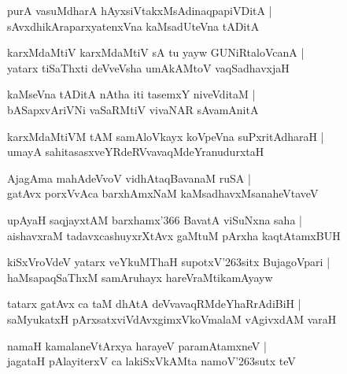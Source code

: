 \begin{shloka}
purA vasuMdharA hAyxsiVtakxMsAdinaqpapiVDitA |\\
sAvxdhikAraparxyatenxVna kaMsadUteVna tADitA
\end{shloka}

\begin{shloka}
karxMdaMtiV karxMdaMtiV sA tu yayw GUNiRtaloVcanA |\\
yatarx tiSaThxti deVveVsha umAkAMtoV vaqSadhavxjaH 
\end{shloka}

\begin{shloka}
kaMseVna tADitA nAtha iti tasemxY niveVditaM |\\
bASapxvAriVNi vaSaRMtiV vivaNAR sAvamAnitA
\end{shloka}

\begin{shloka}
karxMdaMtiVM tAM samAloVkayx koVpeVna suPxritAdharaH |\\
umayA sahitasasxveYRdeRVvavaqMdeYranudurxtaH
\end{shloka}

\begin{shloka}
AjagAma mahAdeVvoV vidhAtaqBavanaM ruSA |\\
gatAvx porxVvAca barxhAmxNaM kaMsadhavxMsanaheVtaveV
\end{shloka}

\begin{shloka}
upAyaH saqjayxtAM barxhamx\char'366 BavatA viSuNxna saha |\\
aishavxraM tadavxcashuyxrXtAvx gaMtuM pArxha kaqtAtamxBUH
\end{shloka}

\begin{shloka}
kiSxVroVdeV yatarx veYkuMThaH supotxV\char'263sitx BujagoVpari |\\
haMsapaqSaThxM samAruhayx hareVraMtikamAyayw
\end{shloka}

\begin{shloka}
tatarx gatAvx ca taM dhAtA deVvavaqRMdeYhaRrAdiBiH |\\
saMyukatxH pArxsatxviVdAvxgimxVkoVmalaM vAgivxdAM varaH
\end{shloka}

\begin{shloka}
namaH kamalaneVtArxya harayeV paramAtamxneV |\\
jagataH pAlayiterxV ca lakiSxVkAMta namoV\char'263sutx teV 
\end{shloka}

